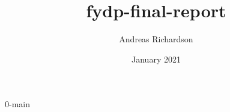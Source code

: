 \documentclass{report}
\title{fydp-final-report}
\author{Andreas Richardson}
\date{January 2021}
\begin{document}
\maketitle



\tableofcontents
\listoffigures
\listoftables

{0-main}
\end{document}
